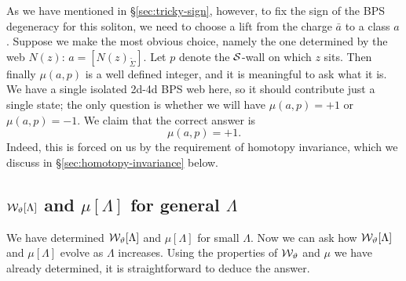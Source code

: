 \documentclass[11pt,a4paper]{article}
\def\wnet {{\cal W}}
\def\cS {{\cal S}}
\def\wnet {{\cal W}}
\begin{document}
As we have mentioned in \S\ref{sec:tricky-sign}, however,
to fix the sign of the BPS degeneracy for this soliton,
we need to choose a lift from the charge $\bar a$ to a class $a$.
Suppose we make the most obvious choice, namely the one determined by the web $N(z)$:  $a = [N(z)_{\tilde\Sigma}]$.  Let $p$ denote the $\cS$-wall on which $z$ sits.
Then finally $\mu(a, p)$ is a well defined integer, and it is meaningful to ask what it is.
We have a single isolated 2d-4d BPS web here, so it should contribute just
a single state; the only question is whether we will have $\mu(a, p) = +1$ or $\mu(a, p) = -1$.
We claim that the correct answer is
\begin{equation} \label{eq:mu-near-bp}
 \mu(a, p) = +1.
\end{equation}
Indeed, this is forced on us by the requirement of homotopy
invariance, which we discuss in \S\ref{sec:homotopy-invariance} below.


\subsection{$\wnet_\vartheta[\Lambda]$ and $\mu[\Lambda]$ for general $\Lambda$} \label{sec:constructing-w}

We have determined $\wnet_\vartheta[\Lambda]$ and $\mu[\Lambda]$ for small
$\Lambda$.
Now we can ask how $\wnet_\vartheta[\Lambda]$ and $\mu[\Lambda]$
evolve as $\Lambda$ increases.
Using the properties of $\wnet_\vartheta$ and $\mu$ we have already determined, it is
straightforward to deduce the answer.
\end{document}
